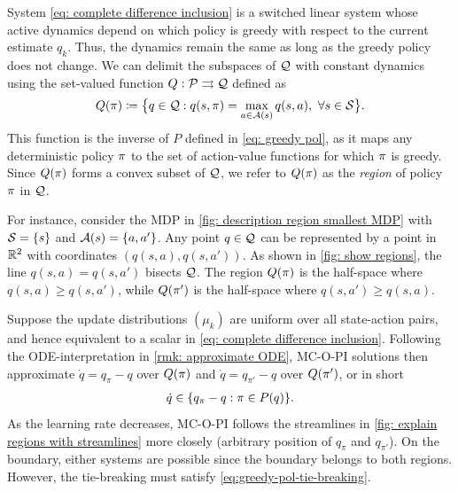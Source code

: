 \vspace{-0.6cm}

System \eqref{eq: complete difference inclusion} is a switched linear system whose active dynamics depend on which policy is greedy with respect to the current estimate $q_k$.
Thus, the dynamics remain the same as long as the greedy policy does not change.
We can delimit the subspaces of $\mathcal{Q}$ with constant dynamics using the set-valued function $Q : \mathcal{P} \rightrightarrows \mathcal{Q}$ defined as
\begin{align}
\label{eq: greedy action values}
    Q(\pi) \coloneqq \big\{ q \in \mathcal{Q} : q(s, \pi) = \max_{a \in \mathcal{A}(s)} q(s,a), \ \forall s \in \mathcal{S} \big\} .
\end{align}
This function is the inverse of $P$ defined in \eqref{eq: greedy pol}, as it maps any deterministic policy $\pi$ to the set of action-value functions for which $\pi$ is greedy.
Since $Q(\pi)$ forms a convex subset of $\mathcal{Q}$, we refer to $Q(\pi)$ as the \textit{region} of policy $\pi$ in $\mathcal{Q}$.


For instance, consider the MDP in \autoref{fig: description region smallest MDP} with $\mathcal{S} = \{s\}$ and $\mathcal{A}(s) = \{a,a'\}$.
Any point $q \in \mathcal{Q}$ can be represented by a point in $\mathbb{R}^2$ with coordinates $( q(s,a), q(s,a') )$.
As shown in \autoref{fig: show regions}, the line $q(s,a) = q(s,a')$ bisects $\mathcal{Q}$.
The region $Q(\pi)$ is the half-space where $q(s,a) \ge q(s,a')$, while $Q(\pi')$ is the half-space where $q(s,a') \ge q(s,a)$.

\label{page: description of switched system}

Suppose the update distributions $(\mu_k)$ are uniform over all state-action pairs, and hence equivalent to a scalar in \eqref{eq: complete difference inclusion}.
Following the ODE-interpretation in \autoref{rmk: approximate ODE},
MC-O-PI solutions then approximate $\dot q = q_{\pi} - q$ over $Q(\pi)$ and $\dot q = q_{\pi'} - q$ over $Q(\pi')$, or in short
\begin{align}
\label{eq: switched ode for interpretation}
\dot q \in \{ q_\pi - q : \pi \in P(q) \}.
\end{align}
As the learning rate decreases, MC-O-PI follows the streamlines in \autoref{fig: explain regions with streamlines} more closely (arbitrary position of $q_\pi$ and $q_{\pi'}$).
On the boundary, either systems are possible since the boundary belongs to both regions. However, the tie-breaking must satisfy \eqref{eq:greedy-pol-tie-breaking}.


